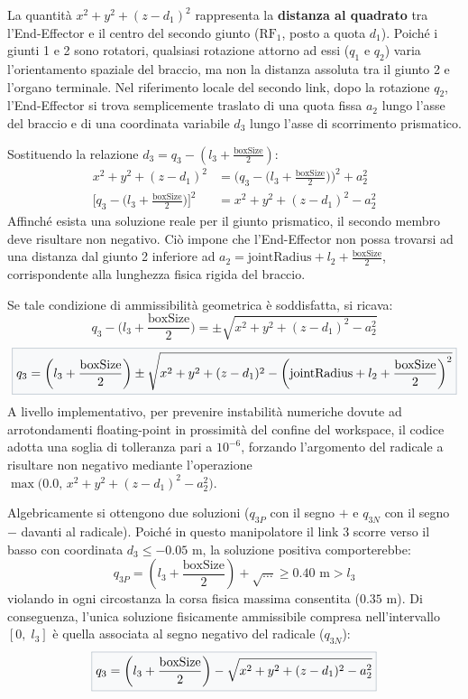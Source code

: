 \documentclass[11pt, a4paper]{report}
\begin{document}
La quantità $x^2 + y^2 + (z - d_1)^2$ rappresenta la \textbf{distanza al quadrato} tra l'End-Effector e il centro del secondo giunto ($\text{RF}_1$, posto a quota $d_1$). Poiché i giunti 1 e 2 sono rotatori, qualsiasi rotazione attorno ad essi ($q_1$ e $q_2$) varia l'orientamento spaziale del braccio, ma non la distanza assoluta tra il giunto 2 e l'organo terminale. Nel riferimento locale del secondo link, dopo la rotazione $q_2$, l'End-Effector si trova semplicemente traslato di una quota fissa $a_2$ lungo l'asse del braccio e di una coordinata variabile $d_3$ lungo l'asse di scorrimento prismatico.

Sostituendo la relazione $d_3 = q_3 - \left(l_3 + \frac{\text{boxSize}}{2}\right)$:
\begin{align*}
    x^2 + y^2 + (z - d_1)^2 &= \biggl(q_3 - \biggl(l_3 + \frac{\text{boxSize}}{2}\biggr) \biggr)^{2} + a_{2}^{2}\\
    \biggl[q_3 - \biggl(l_3 + \frac{\text{boxSize}}{2}\biggr) \biggr]^{2} &= x^2 + y^2 + (z - d_1)^2 - a_{2}^{2}
\end{align*}
Affinché esista una soluzione reale per il giunto prismatico, il secondo membro deve risultare non negativo. Ciò impone che l'End-Effector non possa trovarsi ad una distanza dal giunto 2 inferiore ad $a_2 = \text{jointRadius} + l_{2} + \frac{\text{boxSize}}{2}$, corrispondente alla lunghezza fisica rigida del braccio.

Se tale condizione di ammissibilità geometrica è soddisfatta, si ricava:
\[
    q_3 - \biggl(l_3 + \frac{\text{boxSize}}{2}\biggr) = \pm \sqrt{x^2 + y^2 + (z - d_1)^2 - a_{2}^{2}}
\]
\[
    \fcolorbox{primaryNavy!40}{softBg}{$\displaystyle
        q_3 = \biggl(l_3 + \frac{\text{boxSize}}{2}\biggr) \pm \sqrt{x^2 + y^2 + (z - d_1)^2 - \biggl( \text{jointRadius} + l_{2} + \frac{\text{boxSize}}{2} \biggr)^{2}}
    $}
\]
A livello implementativo, per prevenire instabilità numeriche dovute ad arrotondamenti floating-point in prossimità del confine del workspace, il codice adotta una soglia di tolleranza pari a $10^{-6}$, forzando l'argomento del radicale a risultare non negativo mediante l'operazione $\max\bigl(0.0, \, x^2 + y^2 + (z - d_1)^2 - a_2^2\bigr)$.

Algebricamente si ottengono due soluzioni ($q_{3P}$ con il segno $+$ e $q_{3N}$ con il segno $-$ davanti al radicale). Poiché in questo manipolatore il link 3 scorre verso il basso con coordinata $d_3 \le -0.05\text{ m}$, la soluzione positiva comporterebbe:
\[
q_{3P} = \left(l_3 + \frac{\text{boxSize}}{2}\right) + \sqrt{\dots} \ge 0.40\text{ m} > l_3
\]
violando in ogni circostanza la corsa fisica massima consentita ($0.35\text{ m}$). Di conseguenza, l'unica soluzione fisicamente ammissibile compresa nell'intervallo $[0, \; l_3]$ è quella associata al segno negativo del radicale ($q_{3N}$):
\[
    \fcolorbox{primaryNavy!40}{softBg}{$\displaystyle
        q_3 = \biggl(l_3 + \frac{\text{boxSize}}{2}\biggr) - \sqrt{x^2 + y^2 + (z - d_1)^2 - a_{2}^{2}}
    $}
\]
\end{document}
